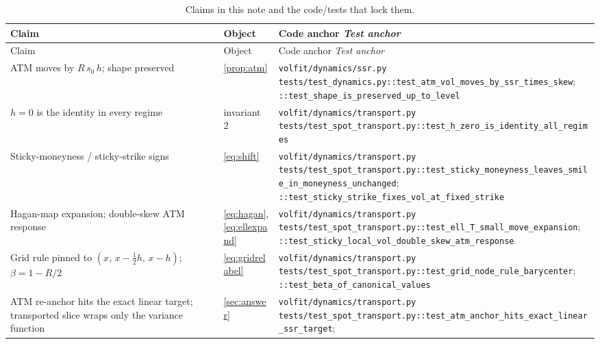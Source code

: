 \documentclass[11pt]{article}
\begin{document}
\begingroup
\small
\setlength{\tabcolsep}{4pt}
\renewcommand{\arraystretch}{1.15}
\begin{longtable}{@{}p{}p{}p{}@{}}
\caption{Claims in this note and the code/tests that lock them.}
\label{tab:trace}\\
\toprule Claim & Object & Code anchor \newline \emph{Test anchor}\\ \midrule
\endfirsthead
\toprule Claim & Object & Code anchor \newline \emph{Test anchor}\\ \midrule
\endhead
ATM moves by $R\,s_0\,h$; shape preserved &
\cref{prop:atm} &
\nolinkurl{volfit/dynamics/ssr.py}\newline
\nolinkurl{tests/test_dynamics.py::test_atm_vol_moves_by_ssr_times_skew};
\nolinkurl{::test_shape_is_preserved_up_to_level}\\
\addlinespace
$h=0$ is the identity in every regime &
invariant~2 &
\nolinkurl{volfit/dynamics/transport.py}\newline
\nolinkurl{tests/test_spot_transport.py::test_h_zero_is_identity_all_regimes}\\
\addlinespace
Sticky-moneyness / sticky-strike signs &
\eqref{eq:shift} &
\nolinkurl{volfit/dynamics/transport.py}\newline
\nolinkurl{tests/test_spot_transport.py::test_sticky_moneyness_leaves_smile_in_moneyness_unchanged};
\nolinkurl{::test_sticky_strike_fixes_vol_at_fixed_strike}\\
\addlinespace
Hagan-map expansion; double-skew ATM response &
\eqref{eq:hagan}, \eqref{eq:ellexpand} &
\nolinkurl{volfit/dynamics/transport.py}\newline
\nolinkurl{tests/test_spot_transport.py::test_ell_T_small_move_expansion};
\nolinkurl{::test_sticky_local_vol_double_skew_atm_response}\\
\addlinespace
Grid rule pinned to $(x,\,x-\tfrac12 h,\,x-h)$; $\beta=1-R/2$ &
\eqref{eq:gridrelabel} &
\nolinkurl{volfit/dynamics/transport.py}\newline
\nolinkurl{tests/test_spot_transport.py::test_grid_node_rule_barycenter};
\nolinkurl{::test_beta_of_canonical_values}\\
\addlinespace
ATM re-anchor hits the exact linear target; transported slice wraps
only the variance function &
\cref{sec:answer} &
\nolinkurl{volfit/dynamics/transport.py}\newline
\nolinkurl{tests/test_spot_transport.py::test_atm_anchor_hits_exact_linear_ssr_target};

\end{longtable}
\end{document}

